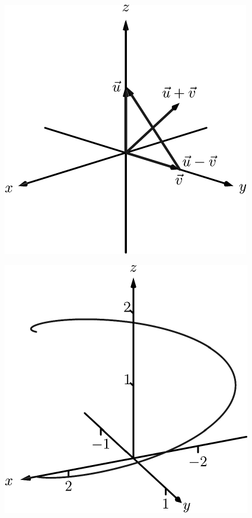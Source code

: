 \documentclass[10pt]{article}
\begin{document}
\includegraphics{fig10_02_ex_15ans_3DBW.pdf}
\texttt{}

\includegraphics{fig11_01_ex_12_3DBW.pdf}
\texttt{}
\end{document}
